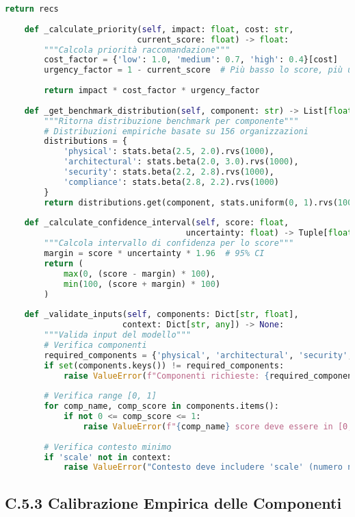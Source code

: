\begin{lstlisting}[language=Python, caption=Classe GISTFramework Completa]
        return recs
    
    def _calculate_priority(self, impact: float, cost: str, 
                           current_score: float) -> float:
        """Calcola priorità raccomandazione"""
        cost_factor = {'low': 1.0, 'medium': 0.7, 'high': 0.4}[cost]
        urgency_factor = 1 - current_score  # Più basso lo score, più urgente
        
        return impact * cost_factor * urgency_factor
    
    def _get_benchmark_distribution(self, component: str) -> List[float]:
        """Ritorna distribuzione benchmark per componente"""
        # Distribuzioni empiriche basate su 156 organizzazioni
        distributions = {
            'physical': stats.beta(2.5, 2.0).rvs(1000),
            'architectural': stats.beta(2.0, 3.0).rvs(1000),
            'security': stats.beta(2.2, 2.8).rvs(1000),
            'compliance': stats.beta(2.8, 2.2).rvs(1000)
        }
        return distributions.get(component, stats.uniform(0, 1).rvs(1000))
    
    def _calculate_confidence_interval(self, score: float, 
                                     uncertainty: float) -> Tuple[float, float]:
        """Calcola intervallo di confidenza per lo score"""
        margin = score * uncertainty * 1.96  # 95% CI
        return (
            max(0, (score - margin) * 100),
            min(100, (score + margin) * 100)
        )
    
    def _validate_inputs(self, components: Dict[str, float], 
                        context: Dict[str, any]) -> None:
        """Valida input del modello"""
        # Verifica componenti
        required_components = {'physical', 'architectural', 'security', 'compliance'}
        if set(components.keys()) != required_components:
            raise ValueError(f"Componenti richieste: {required_components}")
        
        # Verifica range [0, 1]
        for comp_name, comp_score in components.items():
            if not 0 <= comp_score <= 1:
                raise ValueError(f"{comp_name} score deve essere in [0, 1]")
        
        # Verifica contesto minimo
        if 'scale' not in context:
            raise ValueError("Contesto deve includere 'scale' (numero negozi)")
\end{lstlisting}

\subsection{C.5.3 Calibrazione Empirica delle Componenti}

